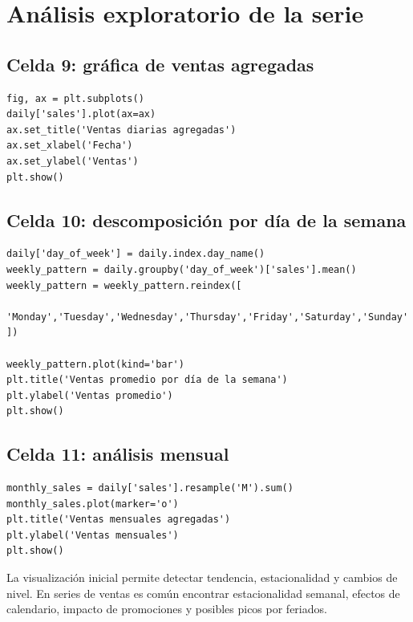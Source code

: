 \documentclass[11pt,letterpaper]{article}
\begin{document}
\section{Análisis exploratorio de la serie}

\subsection{Celda 9: gráfica de ventas agregadas}

\begin{lstlisting}[style=pythoncolab]
fig, ax = plt.subplots()
daily['sales'].plot(ax=ax)
ax.set_title('Ventas diarias agregadas')
ax.set_xlabel('Fecha')
ax.set_ylabel('Ventas')
plt.show()
\end{lstlisting}

\subsection{Celda 10: descomposición por día de la semana}

\begin{lstlisting}[style=pythoncolab]
daily['day_of_week'] = daily.index.day_name()
weekly_pattern = daily.groupby('day_of_week')['sales'].mean()
weekly_pattern = weekly_pattern.reindex([
    'Monday','Tuesday','Wednesday','Thursday','Friday','Saturday','Sunday'
])

weekly_pattern.plot(kind='bar')
plt.title('Ventas promedio por día de la semana')
plt.ylabel('Ventas promedio')
plt.show()
\end{lstlisting}

\subsection{Celda 11: análisis mensual}

\begin{lstlisting}[style=pythoncolab]
monthly_sales = daily['sales'].resample('M').sum()
monthly_sales.plot(marker='o')
plt.title('Ventas mensuales agregadas')
plt.ylabel('Ventas mensuales')
plt.show()
\end{lstlisting}

\begin{interpretacion}
La visualización inicial permite detectar tendencia, estacionalidad y cambios de nivel. En series de ventas es común encontrar estacionalidad semanal, efectos de calendario, impacto de promociones y posibles picos por feriados.
\end{interpretacion}
\end{document}
